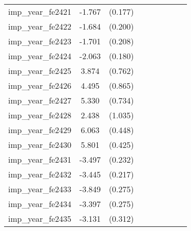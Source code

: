 {\begin{tabular}{l*{4}{cc}}
imp\_year\_fe2421&   -1.767\sym{***}&  (0.177)&                  &         &                  &         &                  &         \\
imp\_year\_fe2422&   -1.684\sym{***}&  (0.200)&                  &         &                  &         &                  &         \\
imp\_year\_fe2423&   -1.701\sym{***}&  (0.208)&                  &         &                  &         &                  &         \\
imp\_year\_fe2424&   -2.063\sym{***}&  (0.180)&                  &         &                  &         &                  &         \\
imp\_year\_fe2425&    3.874\sym{***}&  (0.762)&                  &         &                  &         &                  &         \\
imp\_year\_fe2426&    4.495\sym{***}&  (0.865)&                  &         &                  &         &                  &         \\
imp\_year\_fe2427&    5.330\sym{***}&  (0.734)&                  &         &                  &         &                  &         \\
imp\_year\_fe2428&    2.438\sym{*}  &  (1.035)&                  &         &                  &         &                  &         \\
imp\_year\_fe2429&    6.063\sym{***}&  (0.448)&                  &         &                  &         &                  &         \\
imp\_year\_fe2430&    5.801\sym{***}&  (0.425)&                  &         &                  &         &                  &         \\
imp\_year\_fe2431&   -3.497\sym{***}&  (0.232)&                  &         &                  &         &                  &         \\
imp\_year\_fe2432&   -3.445\sym{***}&  (0.217)&                  &         &                  &         &                  &         \\
imp\_year\_fe2433&   -3.849\sym{***}&  (0.275)&                  &         &                  &         &                  &         \\
imp\_year\_fe2434&   -3.397\sym{***}&  (0.275)&                  &         &                  &         &                  &         \\
imp\_year\_fe2435&   -3.131\sym{***}&  (0.312)&                  &         &                  &         &                  &         \\

\end{tabular}}

